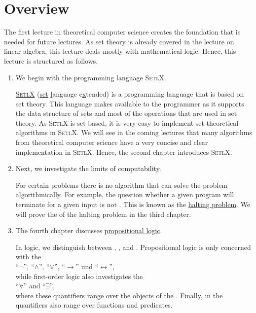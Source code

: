 \section{Overview} 
The first lecture in theoretical computer science creates the foundation that is needed for future lectures.
As set theory is already covered in the lecture on linear algebra, this lecture deals mostly with mathematical
logic.  Hence, this lecture is structured as follows.
\begin{enumerate}
\item We begin with the programming language \textsc{SetlX}.

      \href{http://randoom.org/Software/SetlX}{\textsc{SetlX}} (\underline{set} \underline{l}anguage
      e\underline{x}tended) is a programming language that is based on set theory.  This language
      makes  available to the programmer as it supports the data structure of
      sets and most of the operations that are used in set theory.  As \textsc{SetlX} is set based,
      it is very easy to implement set theoretical algorithms in \textsc{SetlX}.  We will see in the
      coming lectures that many algorithms from theoretical computer science have a very concise
      and clear implementation in \textsc{SetlX}.  Hence, the second chapter introduces \textsc{SetlX}.
\item Next, we investigate the limits of computability.

      For certain problems there is no algorithm that can solve the problem algorithmically. 
      For example, the question whether a given program will terminate for a given input is not
      .  This is known as the \href{https://en.wikipedia.org/wiki/Halting_problem}{halting problem}.  
      We will prove the  of the halting problem in the third chapter. 
\item The fourth chapter discusses \href{https://en.wikipedia.org/wiki/Propositional_calculus}{propositional logic}.

      In logic, we distinguish between  ,
      , and .  Propositional logic is only
      concerned with the 
      \\[0.2cm]
      \hspace*{1.3cm}
      ``$\neg$'', ``$\wedge$'', ``$\vee$'', ``$\rightarrow$'' und ``$\leftrightarrow$'',
      \\[0.2cm]
      while first-order logic also investigates the 
      \\[0.2cm]
      \hspace*{1.3cm}
      ``$\forall$'' and ``$\exists$'',
      \\[0.2cm]
      where these quantifiers range over the objects of the .
      Finally, in  the quantifiers also range over functions and predicates.


\end{enumerate}
